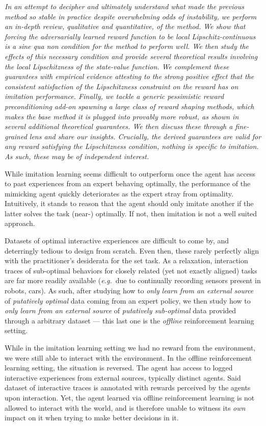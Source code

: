\emph{%
In an attempt to decipher and ultimately understand what made
the previous method so stable in practice despite overwhelming odds of instability, we
perform an in-depth review, qualitative and quantitative, of the method.
We show that forcing the adversarially learned reward function to be local Lipschitz-continuous
is a \textit{sine qua non} condition for the method to perform well.
We then study the effects of this necessary condition and provide several theoretical results
involving the local Lipschitzness of the state-value function.
We complement these guarantees with empirical evidence attesting to the strong
positive effect that the consistent satisfaction of the Lipschitzness constraint on the reward has
on imitation performance.
Finally, we tackle a generic pessimistic reward preconditioning add-on
spawning a large class of reward shaping methods, which
makes the base method it is plugged into provably more robust, as shown in several
additional theoretical guarantees.
We then discuss these through a fine-grained lens and share our insights.
Crucially, the derived guarantees are valid for \emph{any} reward
satisfying the Lipschitzness condition, nothing is specific to imitation.
As such, these may be of independent interest.
}

While imitation learning seems difficult to outperform
once the agent has access to past experiences from an expert behaving optimally,
the performance of the mimicking agent quickly deteriorates as the expert stray from optimality.
Intuitively, it stands to reason that the agent should only imitate another if the latter
solves the task (near-) optimally. If not, then imitation is not a well suited approach.

Datasets of optimal interactive experiences are difficult to come by,
and deterringly tedious to design from scratch.
Even then, these rarely perfectly align with the practitioner's desiderata for the set task.
As a relaxation, interaction traces of sub-optimal behaviors for closely related (yet not exactly aligned) tasks
are far more readily available
(\textit{e.g.}~due to continually recording sensors present in robots, cars).
As such, after studying how to \emph{only learn from an external source} of \emph{putatively optimal} data coming
from an expert policy, we then study how to \emph{only learn from an external source} of
\emph{putatively sub-optimal} data provided through a arbitrary dataset ---
this last one is the \emph{offline} reinforcement learning setting.

While in the imitation learning setting we had no reward from the environment,
we were still able to interact with the environment.
In the offline reinforcement learning setting, the situation is reversed.
The agent has access to logged interactive experiences from external sources, typically distinct agents.
Said dataset of interactive traces is annotated with rewards perceived by the agents upon interaction.
Yet, the agent learned via offline reinforcement learning
is not allowed to interact with the world, and is therefore unable to witness its \emph{own} impact on it when trying
to make better decisions in it.

